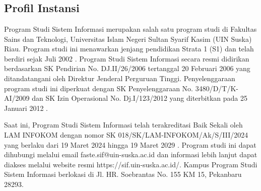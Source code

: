 %
%
%
%

\chapter{\babDua}


\section{Profil Instansi}
\thispagestyle{fancy}
Program Studi Sistem Informasi merupakan salah satu program studi di Fakultas Sains dan Teknologi, Universitas Islam Negeri Sultan Syarif Kasim (UIN Suska) Riau. Program studi ini menawarkan jenjang pendidikan Strata 1 (S1) dan telah berdiri sejak Juli 2002 \cite{web-prodi}. Program Studi Sistem Informasi secara resmi didirikan berdasarkan SK Pendirian No. DJ.II/26/2006 tertanggal 20 Februari 2006 yang ditandatangani oleh Direktur Jenderal Perguruan Tinggi. Penyelenggaraan program studi ini diperkuat dengan SK Penyelenggaraan No. 3480/D/T/K-AI/2009 dan SK Izin Operasional No. Dj.I/123/2012 yang diterbitkan pada 25 Januari 2012 \cite{web-prodi}.

Saat ini, Program Studi Sistem Informasi telah terakreditasi Baik Sekali oleh LAM INFOKOM dengan nomor SK 018/SK/LAM-INFOKOM/Ak/S/III/2024 yang berlaku dari 19 Maret 2024 hingga 19 Maret 2029 \cite{web-prodi}. Program studi ini dapat dihubungi melalui email faste.sif@uin-suska.ac.id dan informasi lebih lanjut dapat diakses melalui website resmi https://sif.uin-suska.ac.id/. Kampus Program Studi Sistem Informasi berlokasi di Jl. HR. Soebrantas No. 155 KM 15, Pekanbaru 28293.
